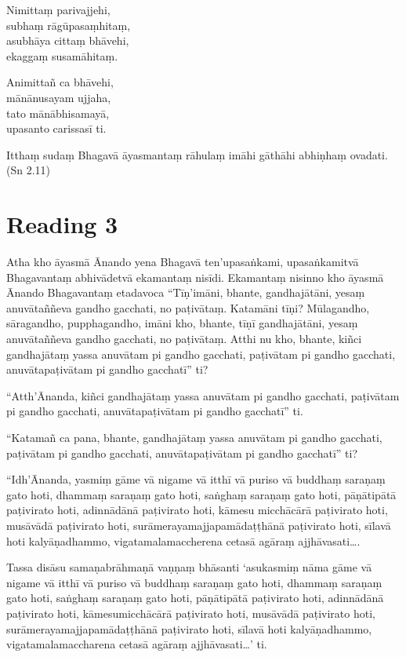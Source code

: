 Nimittaṃ parivajjehi,\\
subhaṃ rāgūpasaṃhitaṃ,\\
asubhāya cittaṃ bhāvehi,\\
ekaggaṃ susamāhitaṃ.

Animittañ ca bhāvehi,\\
mānānusayam ujjaha,\\
tato mānābhisamayā,\\
upasanto carissasī ti.

Itthaṃ sudaṃ Bhagavā āyasmantaṃ rāhulaṃ imāhi gāthāhi abhiṇhaṃ ovadati. (Sn 2.11)

\section*{Reading 3}

Atha kho āyasmā Ānando yena Bhagavā ten’upasaṅkami, upasaṅkamitvā Bhagavantaṃ abhivādetvā ekamantaṃ nisīdi. Ekamantaṃ nisinno kho āyasmā Ānando Bhagavantaṃ etadavoca “Tīṇ’imāni, bhante, gandhajātāni, yesaṃ anuvātaññeva gandho gacchati, no paṭivātaṃ. Katamāni tīṇi? Mūlagandho, sāragandho, pupphagandho, imāni kho, bhante, tīṇī gandhajātāni, yesaṃ anuvātaññeva gandho gacchati, no paṭivātaṃ. Atthi nu kho, bhante, kiñci gandhajātaṃ yassa anuvātam pi gandho gacchati, paṭivātam pi gandho gacchati, anuvātapaṭivātam pi gandho gacchatī” ti?

“Atth’Ānanda, kiñci gandhajātaṃ yassa anuvātam pi gandho gacchati, paṭivātam pi gandho gacchati, anuvātapaṭivātam pi gandho gacchatī” ti.

“Katamañ ca pana, bhante, gandhajātaṃ yassa anuvātam pi gandho gacchati, paṭivātam pi gandho gacchati, anuvātapaṭivātam pi gandho gacchatī” ti?

“Idh’Ānanda, yasmiṃ gāme vā nigame vā itthī vā puriso vā buddhaṃ saraṇaṃ gato hoti, dhammaṃ saraṇaṃ gato hoti, saṅghaṃ saraṇaṃ gato hoti, pāṇātipātā paṭivirato hoti, adinnādānā paṭivirato hoti, kāmesu micchācārā paṭivirato hoti, musāvādā paṭivirato hoti, surāmerayamajjapamādaṭṭhānā paṭivirato hoti, sīlavā hoti kalyāṇadhammo, vigatamalamaccherena cetasā agāraṃ ajjhāvasati….

Tassa disāsu samaṇabrāhmaṇā vaṇṇaṃ bhāsanti ‘asukasmiṃ nāma gāme vā nigame vā itthī vā puriso vā buddhaṃ saraṇaṃ gato hoti, dhammaṃ saraṇaṃ gato hoti, saṅghaṃ saraṇaṃ gato hoti, pāṇātipātā paṭivirato hoti, adinnādānā paṭivirato hoti, kāmesumicchācārā paṭivirato hoti, musāvādā paṭivirato hoti, surāmerayamajjapamādaṭṭhānā paṭivirato hoti, sīlavā hoti kalyāṇadhammo, vigatamalamaccharena cetasā agāraṃ ajjhāvasati…’ ti.

